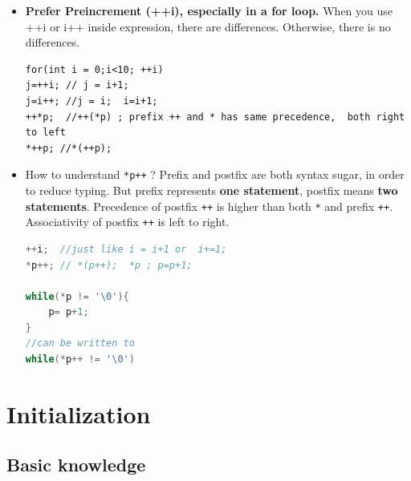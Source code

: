 \documentclass[a4paper,11pt,twoside]{book}
\begin{document}
\begin{itemize}
	\item \textbf{Prefer Preincrement (++i), especially in a for loop.}  When you use ++i or i++ inside expression, there are differences. Otherwise, there is no differences.
	
\begin{lstlisting}[numbers=none]
for(int i = 0;i<10; ++i)
j=++i; // j = i+1;
j=i++; //j = i;  i=i+1;
++*p;  //++(*p) ; prefix ++ and * has same precedence,  both right to left
*++p; //*(++p);
\end{lstlisting}
	
	\item How to understand \texttt{*p++} ? Prefix and postfix are both syntax sugar, in order to reduce typing.   But prefix represents \textbf{one statement}, postfix means \textbf{two statements}. Precedence of postfix \texttt{++} is higher than both \texttt{*} and prefix \texttt{++}. Associativity of postfix \texttt{++} is left to right.
\begin{lstlisting}[frame=single, language=c++]
++i;  //just like i = i+1 or  i+=1;
*p++; // *(p++);  *p ; p=p+1;

while(*p != '\0'){
	p= p+1;
}
//can be written to
while(*p++ != '\0')	
\end{lstlisting}		
	
\end{itemize}

\chapter{Initialization}
\section{Basic knowledge}
\end{document}
